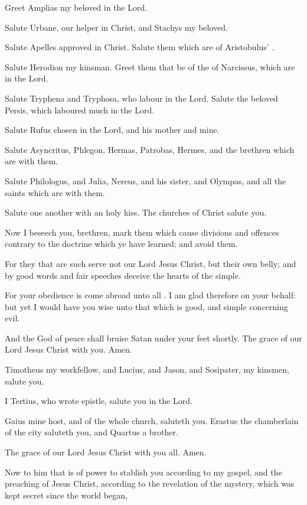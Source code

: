 {Greet
Amplias
my
beloved
in the
Lord.

Salute
Urbane,
our
helper
in
Christ,
and
Stachys
my
beloved.

Salute
Apelles
approved
in
Christ.
Salute them which
are
of
Aristobulus’
{}.

Salute
Herodion
my
kinsman.
Greet them that
be
of
the
{} of
Narcissus, which
are
in the
Lord.

Salute
Tryphena
and
Tryphosa, who
labour
in the
Lord.
Salute the
beloved
Persis,
which
laboured
much
in the
Lord.

Salute
Rufus
chosen
in the
Lord,
and
his
mother
and
mine.

Salute
Asyncritus,
Phlegon,
Hermas,
Patrobas,
Hermes,
and the
brethren which are
with
them.

Salute
Philologus,
and
Julia,
Nereus,
and
his
sister,
and
Olympas,
and
all the
saints which are
with
them.

Salute one
another
with
an
holy
kiss. The
churches of
Christ
salute
you.


\par }{\PP {}Now I
beseech
you,
brethren,
mark them which
cause
divisions
and
offences contrary
to the
doctrine
which
ye have
learned;
and
avoid
them.

For they that are
such
serve
not
our
Lord
Jesus
Christ,
but their
own
belly;
and
by good
words
and fair
speeches
deceive the
hearts of the
simple.

For
your
obedience is come
abroad
unto
all
{}. I am
glad
therefore
on
your
behalf: but
yet I would
have
you
wise
unto that which is
good,
and
simple
concerning
evil.

And the
God of
peace shall
bruise
Satan
under
your
feet
shortly. The
grace
of
our
Lord
Jesus
Christ
{}
with
you.
Amen.


\par }{\PP {}Timotheus
my
workfellow,
and
Lucius,
and
Jason,
and
Sosipater,
my
kinsmen,
salute
you.

I
Tertius, who
wrote
{}
epistle,
salute
you
in the
Lord.

Gaius
mine
host,
and of
the
whole
church,
saluteth
you.
Erastus the
chamberlain of the
city
saluteth
you,
and
Quartus a
brother.

The
grace
of
our
Lord
Jesus
Christ
{}
with
you
all.
Amen.


\par }{\PP {}Now to him that is of
power to
stablish
you according
to
my
gospel,
and the
preaching of
Jesus
Christ, according
to the
revelation of the
mystery, which was kept
secret since the world
began,

}
